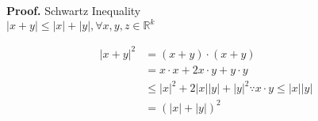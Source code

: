 \documentclass{article}
\begin{document}
  {\bf Proof.} Schwartz Inequality \\
  
  $|x+y| \leq |x| + |y|, \forall x, y, z \in \mathbb{R}^k$

  \begin{align*}
    |x + y|^2 & =     (x+y) \cdot (x+y) \\
              & =     x \cdot x + 2 x \cdot y + y \cdot y \\
              & \leq  |x|^2 + 2|x||y| + |y|^2 \because x \cdot y \leq |x||y| \\
              & = (|x| + |y|)^2
  \end{align*}
\end{document}
